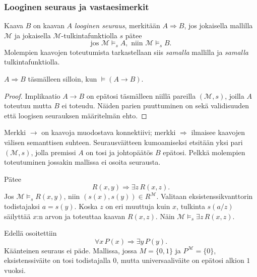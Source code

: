 \documentclass[11pt,a4paper]{amsart}
\begin{document}
\clearpage
\subsubsection{Looginen seuraus ja vastaesimerkit}

\begin{definition}
  Kaava $B$ on kaavan $A$ \emph{looginen seuraus}, merkitään
  $A\Rightarrow B$, jos jokaisella mallilla $\mathcal M$ ja jokaisella
  $\mathcal M$-tulkintafunktiolla $s$ pätee
  \[
    \text{jos }\mathcal M\models_s A,\text{ niin }\mathcal M\models_s B.
  \]
  Molempien kaavojen toteutumista tarkastellaan siis \emph{samalla}
  mallilla ja \emph{samalla} tulkintafunktiolla.
\end{definition}

\begin{proposition}
  $A\Rightarrow B$ täsmälleen silloin, kun $\models(A\to B)$.
\end{proposition}

\begin{proof}
  Implikaatio $A\to B$ on epätosi täsmälleen niillä pareilla
  $(\mathcal M,s)$, joilla $A$ toteutuu mutta $B$ ei toteudu.
  Näiden parien puuttuminen on sekä validisuuden että loogisen
  seurauksen määritelmän ehto.
\end{proof}

Merkki $\to$ on kaavoja muodostava konnektiivi; merkki $\Rightarrow$
ilmaisee kaavojen välisen semanttisen suhteen.
Seurausväitteen kumoamiseksi etsitään yksi pari $(\mathcal M,s)$,
jolla premissi $A$ on tosi ja johtopäätös $B$ epätosi.
Pelkkä molempien toteutuminen jossakin mallissa ei osoita seurausta.

\begin{example}
  Pätee
  \[
    R(x,y)\Rightarrow\exists z\,R(x,z).
  \]
  Jos $\mathcal M\models_s R(x,y)$, niin
  $(s(x),s(y))\in R^{\mathcal M}$. Valitaan eksistenssikvanttorin
  todistajaksi $a=s(y)$. Koska $z$ on eri muuttuja kuin $x$, tulkinta
  $s(a/z)$ säilyttää $x$:n arvon ja toteuttaa kaavan $R(x,z)$.
  Näin $\mathcal M\models_s\exists z\,R(x,z)$.
\end{example}

\begin{example}
  Edellä osoitettiin
  \[
    \forall x\,P(x)\Rightarrow\exists y\,P(y).
  \]
  Käänteinen seuraus ei päde. Mallissa, jossa $M=\{0,1\}$ ja
  $P^{\mathcal M}=\{0\}$, eksistenssiväite on tosi todistajalla $0$,
  mutta universaaliväite on epätosi alkion $1$ vuoksi.
\end{example}
\end{document}
